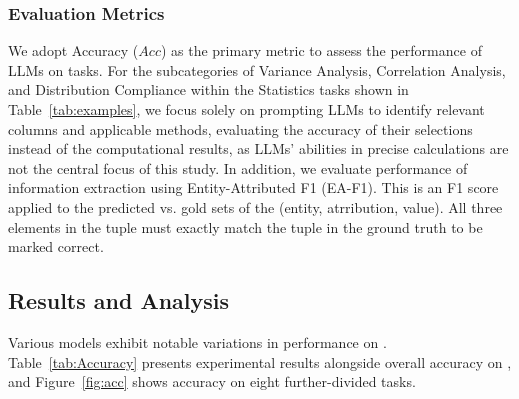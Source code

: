 \subsubsection{Evaluation Metrics}
We adopt Accuracy ($Acc$) as the primary metric to assess the performance of LLMs on \ben tasks. For the subcategories of Variance Analysis, Correlation Analysis, and Distribution Compliance within the Statistics tasks shown in Table~\ref{tab:examples}, we focus solely on prompting LLMs to identify relevant columns and applicable methods, evaluating the accuracy of their selections instead of the computational results, as LLMs' abilities in precise calculations are not the central focus of this study. In addition, we evaluate performance of information extraction using Entity-Attributed F1 (EA-F1). This is an F1 score applied to the predicted vs. gold sets of the \colorbox{black!5}{(entity, atrribution, value)}. All three elements in the tuple must exactly match the tuple in the ground truth to be marked correct.  

\subsection{Results and Analysis}

Various models exhibit notable variations in performance on \ben. 
Table~\ref{tab:Accuracy} presents experimental results alongside overall accuracy on \ben, and Figure~\ref{fig:acc} shows accuracy on eight further-divided tasks.


